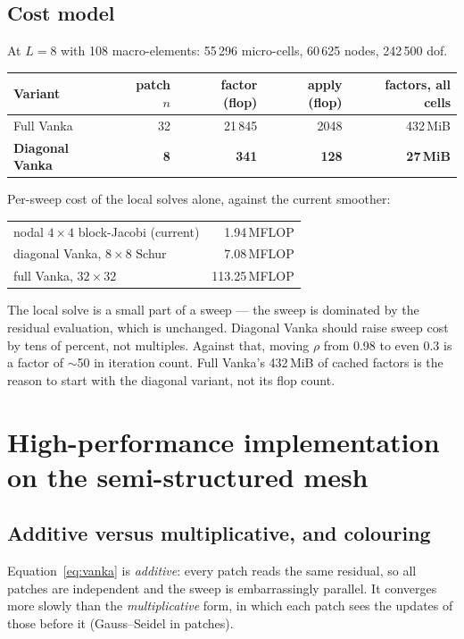 \documentclass[11pt,a4paper]{article}
\begin{document}
\subsection{Cost model}
At $L=8$ with 108 macro-elements: 55\,296 micro-cells, 60\,625 nodes, 242\,500 dof.
\begin{center}
\begin{tabular}{@{}lrrrr@{}}
\toprule
Variant & patch $n$ & factor (flop) & apply (flop) & factors, all cells \\
\midrule
Full Vanka & 32 & 21\,845 & 2048 & 432\,MiB \\
\textbf{Diagonal Vanka} & \textbf{8} & \textbf{341} & \textbf{128} & \textbf{27\,MiB} \\
\bottomrule
\end{tabular}
\end{center}
Per-sweep cost of the local solves alone, against the current smoother:
\begin{center}
\begin{tabular}{@{}lr@{}}
\toprule
nodal $4\times4$ block-Jacobi (current) & 1.94\,MFLOP \\
diagonal Vanka, $8\times8$ Schur & 7.08\,MFLOP \\
full Vanka, $32\times32$ & 113.25\,MFLOP \\
\bottomrule
\end{tabular}
\end{center}

\begin{tcolorbox}[colback=orange!6,colframe=orange!60!black,title={\bfseries The trade, stated plainly}]
The local solve is a small part of a sweep --- the sweep is dominated by the residual
evaluation, which is unchanged. Diagonal Vanka should raise sweep cost by tens of percent, not
multiples. Against that, moving $\rho$ from 0.98 to even 0.3 is a factor of $\sim$50 in
iteration count. Full Vanka's 432\,MiB of cached factors is the reason to start with the
diagonal variant, not its flop count.
\end{tcolorbox}

\section{High-performance implementation on the semi-structured mesh}

\subsection{Additive versus multiplicative, and colouring}
Equation~\eqref{eq:vanka} is \emph{additive}: every patch reads the same residual, so all
patches are independent and the sweep is embarrassingly parallel. It converges more slowly
than the \emph{multiplicative} form, in which each patch sees the updates of those before it
(Gauss--Seidel in patches).
\end{document}
